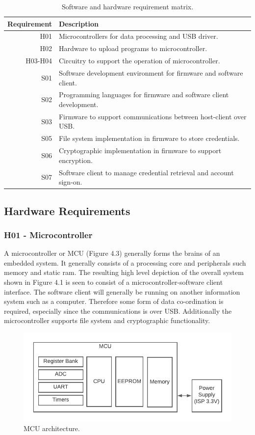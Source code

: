 \begin{table}[H]
\centering

\begin{tabular}{|r|l|}
\hline
\multicolumn{1}{|l|}{\textbf{Requirement}} & \textbf{Description} \\ \hline
H01 & Microcontrollers for data processing and USB driver. \\ \hline
H02 & Hardware to upload programs to microcontroller.\\ \hline
H03-H04 & Circuitry to support the operation of microcontroller. \\ \hline
S01 & Software development environment for firmware and software client.\\ \hline
S02 & Programming languages for firmware and software client development. \\ \hline
S03 & Firmware to support communications between host-client over USB. \\ \hline
S05 & File system implementation in firmware to store credentials. \\ \hline
S06 & Cryptographic implementation in firmware to support encryption. \\  \hline
S07 & Software client to manage credential retrieval and account sign-on.\\ \hline
\end{tabular}
\caption{Software and hardware requirement matrix.}
\label{tbl:HWSWRequirements}
\end{table}
\subsection{Hardware Requirements}
\subsubsection{H01 - Microcontroller }
A microcontroller or MCU (Figure 4.3) generally forms the brains of an embedded system. It generally consists of a processing core and peripherals such memory and static ram. The resulting high level depiction of the overall system shown in Figure 4.1 is seen to consist of a microcontroller-software client interface. The software client will generally be running on another information system such as a computer. Therefore some form of data co-ordination is required, especially since the communications is over USB. Additionally the microcontroller supports file system and cryptographic functionality. 

\begin{figure}[H]
\centering
\includegraphics[width=0.8\columnwidth]{Figures/Fig_67.png}
\caption{MCU architecture.}
\label{fig:gantt}
\end{figure}

